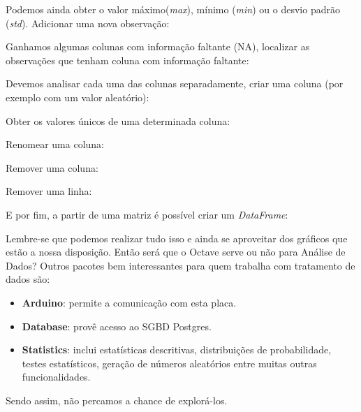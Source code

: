 \documentclass[a4paper,11pt]{article}
\begin{document}
Podemos ainda obter o valor máximo(\textit{max}), mínimo (\textit{min}) ou o desvio padrão (\textit{std}). Adicionar uma nova observação: \\

Ganhamos algumas colunas com informação faltante (NA), localizar as observações que tenham coluna com informação faltante: \\

Devemos analisar cada uma das colunas separadamente, criar uma coluna (por exemplo com um valor aleatório): \\

Obter os valores únicos de uma determinada coluna: \\

Renomear uma coluna: \\

Remover uma coluna: \\

Remover uma linha: \\

E por fim, a partir de uma matriz é possível criar um \textit{DataFrame}: \\

Lembre-se que podemos realizar tudo isso e ainda se aproveitar dos gráficos que estão a nossa disposição. Então será que o Octave serve ou não para Análise de Dados? Outros pacotes bem interessantes para quem trabalha com tratamento de dados são: \vspace{-1em}
\begin{itemize}
	\item \textbf{Arduino}: permite a comunicação com esta placa.
	\item \textbf{Database}: provê acesso ao SGBD Postgres.
	\item \textbf{Statistics}: inclui estatísticas descritivas, distribuições de probabilidade, testes estatísticos, geração de números aleatórios entre muitas outras funcionalidades.
\end{itemize}

Sendo assim, não percamos a chance de explorá-los.
\end{document}
